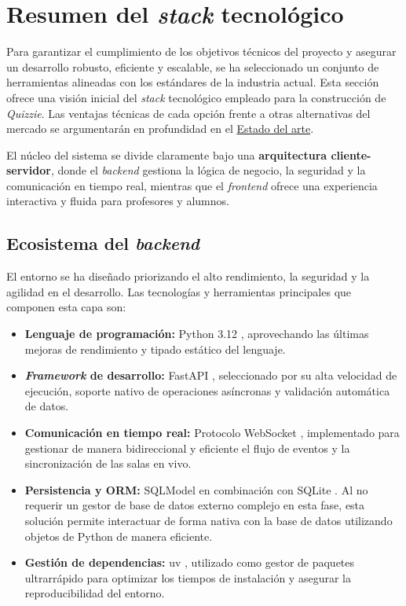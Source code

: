 \section{Resumen del \textit{stack} tecnológico}\label{sec:resumen_del_stack_tecnologico}

Para garantizar el cumplimiento de los objetivos técnicos del proyecto y asegurar un desarrollo robusto, eficiente y escalable, se ha seleccionado un conjunto de herramientas alineadas con los estándares de la industria actual. Esta sección ofrece una visión inicial del \textit{stack} tecnológico empleado para la construcción de \textit{Quizzie}. Las ventajas técnicas de cada opción frente a otras alternativas del mercado se argumentarán en profundidad en el \hyperref[cap:estado_del_arte_y_fundamentacion]{Estado del arte}.

El núcleo del sistema se divide claramente bajo una \textbf{arquitectura cliente-servidor}, donde el \textit{backend} gestiona la lógica de negocio, la seguridad y la comunicación en tiempo real, mientras que el \textit{frontend} ofrece una experiencia interactiva y fluida para profesores y alumnos.

\subsection{Ecosistema del \textit{backend}}
El entorno se ha diseñado priorizando el alto rendimiento, la seguridad y la agilidad en el desarrollo. Las tecnologías y herramientas principales que componen esta capa son:
\begin{itemize}
    \item \textbf{Lenguaje de programación:} Python 3.12 \cite{python_official}, aprovechando las últimas mejoras de rendimiento y tipado estático del lenguaje.
    \item \textbf{\textit{Framework} de desarrollo:} FastAPI \cite{fastapi_official}, seleccionado por su alta velocidad de ejecución, soporte nativo de operaciones asíncronas y validación automática de datos.
    \item \textbf{Comunicación en tiempo real:} Protocolo WebSocket \cite{websocket_protocol}, implementado para gestionar de manera bidireccional y eficiente el flujo de eventos y la sincronización de las salas en vivo.
    \item \textbf{Persistencia y ORM:} SQLModel \cite{sqlmodel_official} en combinación con SQLite \cite{sqlite_official}. Al no requerir un gestor de base de datos externo complejo en esta fase, esta solución permite interactuar de forma nativa con la base de datos utilizando objetos de Python de manera eficiente.
    \item \textbf{Gestión de dependencias:} uv \cite{uv_official}, utilizado como gestor de paquetes ultrarrápido para optimizar los tiempos de instalación y asegurar la reproducibilidad del entorno.
\end{itemize}

